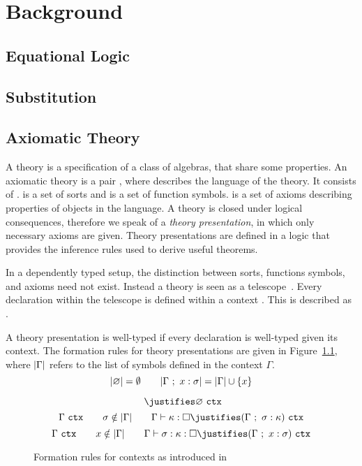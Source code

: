 \chapter{Background}

\section{Equational Logic}

\section{Substitution}

\section{Axiomatic Theory}
A theory is a specification of a class of algebras, that share some properties. 
An axiomatic theory is a pair , where  describes the language of the theory. It consists of .  is a set of sorts and  is a set of function symbols. \lstmath{$\Sigma$} is a set of axioms describing properties of objects in the language. A theory is closed under logical consequences, therefore we speak of a \emph{theory presentation}, in which only necessary axioms are given. Theory presentations are defined in a logic that provides the inference rules used to derive useful theorems.  

In a dependently typed setup, the distinction between sorts, functions symbols, and axioms need not exist. Instead a theory is seen as a telescope~\cite{de1991telescopic}. Every declaration  within the telescope is defined within a context \lstmath{$\Gamma$}. This is described as .  

A theory presentation is well-typed if every declaration  is well-typed given its context. The formation rules for theory presentations are given in Figure~\ref{fig:ctx}, where $| \Gamma |$ refers to the list of symbols defined in the context $\Gamma$. 
$$ | \varnothing | = \emptyset \qquad
| \Gamma\ ;\ x : \sigma | = | \Gamma | \cup \left\{ x \right\}
$$
\begin{figure}[ht]
    \begin{proofrules}
        \[ \ \justifies \varnothing \ \wfctx \]
        \[ \context{\Gamma}\ \wfctx \qquad \sigma \notin \syms{\context{\Gamma}}
        \qquad \context{\Gamma} \vdash \kappa : \Box \justifies
        (\context{\Gamma}\ ;\ \sigma : \kappa)\ \wfctx \]
        \[ \context{\Gamma}\ \wfctx \qquad x\notin \syms{\context{\Gamma}}
        \qquad \context{\Gamma} \vdash \sigma : \kappa : \Box \justifies
        (\context{\Gamma}\ ;\ x : \sigma)\ \wfctx \]
    \end{proofrules}
    \caption{Formation rules for contexts as introduced in~\cite{carette2018building}}
    \label{fig:ctx}
\end{figure}

